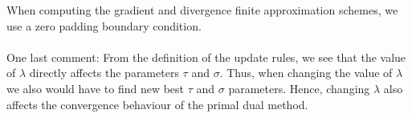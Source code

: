 When computing the gradient and divergence finite approximation schemes, we use a zero padding boundary condition. \\ \\
One last comment: From the definition of the update rules, we see that the value of $\lambda$ directly affects the parameters $\tau$ and $\sigma$. Thus, when changing the value of $\lambda$ we also would have to find new best $\tau$ and $\sigma$ parameters. Hence, changing $\lambda$ also affects the convergence behaviour of the primal dual method. 




